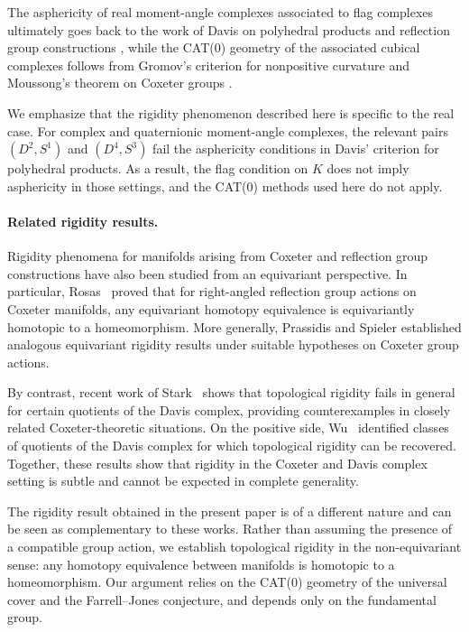 \documentclass[11pt,a4paper]{article}
\numberwithin{equation}{section}
\theoremstyle{named}
\begin{document}
The asphericity of real moment-angle complexes associated to flag complexes ultimately goes back to the work of Davis on polyhedral products and reflection group constructions \cite{rafca}, while the CAT(0) geometry of the associated cubical complexes follows from Gromov's criterion for nonpositive curvature \cite{gromov} and Moussong's theorem on Coxeter groups \cite{moussong}.

We emphasize that the rigidity phenomenon described here is specific to the real case. For complex and quaternionic moment-angle complexes, the relevant pairs $(D^2,S^1)$ and $(D^4,S^3)$ fail the asphericity conditions in Davis' criterion for polyhedral products. As a result, the flag condition on $K$ does not imply asphericity in those settings, and the CAT(0) methods used here do not apply.

\paragraph*{Related rigidity results.}
Rigidity phenomena for manifolds arising from Coxeter and reflection group constructions have also been studied from an equivariant perspective. In particular, Rosas~\cite{Rosas88} proved that for right-angled reflection group actions on Coxeter manifolds, any equivariant homotopy equivalence is equivariantly homotopic to a homeomorphism. More generally, Prassidis and Spieler  \cite{prasspieler} established analogous equivariant rigidity results under suitable hypotheses on Coxeter group actions.

By contrast, recent work of Stark~\cite{stark} shows that topological rigidity fails in general for certain quotients of the Davis complex, providing counterexamples in closely related Coxeter-theoretic situations. On the positive side, Wu~\cite{wu} identified classes of quotients of the Davis complex for which topological rigidity can be recovered. Together, these results show that rigidity in the Coxeter and Davis complex setting is subtle and cannot be expected in complete generality.

The rigidity result obtained in the present paper is of a different nature and can be seen as complementary to these works. Rather than assuming the presence of a compatible group action, we establish topological rigidity in the non-equivariant sense: any homotopy equivalence between manifolds is homotopic to a homeomorphism. Our argument relies on the CAT(0) geometry of the universal cover and the Farrell--Jones conjecture, and depends only on the fundamental group.
\end{document}
